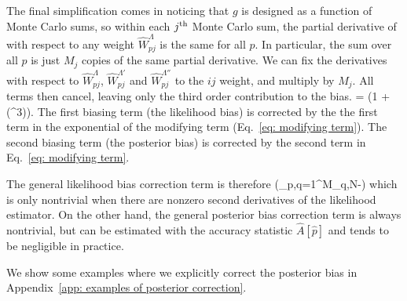 The final simplification comes in noticing that $g$ is designed as a function of Monte Carlo sums, so within each $j^{\rm th}$ Monte Carlo sum, the partial derivative of with respect to any weight $\hat{W}_{pj}^\Lambda$ is the same for all $p$. In particular, the sum over all $p$ is just $M_j$ copies of the same partial derivative. We can fix the derivatives with respect to $\hat{W}_{pj}^\Lambda$, $\hat{W}_{pj}^{\Lambda'}$ and $\hat{W}_{pj}^{\Lambda''}$ to the $ij$ weight, and multiply by $M_j$. All terms then cancel, leaving only the third order contribution to the bias.
\beq
{} = \left(1 + (\hat{\bm \delta}^3)\right).
\eeq
The first biasing term (the likelihood bias) is corrected by the the first term in the exponential of the modifying term (Eq.~\ref{eq: modifying term}). The second biasing term (the posterior bias) is corrected by the second term in Eq.~\ref{eq: modifying term}. 

The general likelihood bias correction term is therefore
\beq
\exp\left(\sum_{p,q=1}^{M_q,N}-\right)
\label{eq: general likelihood bias correction}
\eeq
which is only nontrivial when there are nonzero second derivatives of the likelihood estimator. On the other hand, the general posterior bias correction term is always nontrivial, but can be estimated with the accuracy statistic $\hat{A}[\hat{p}]$ and tends to be negligible in practice.

We show some examples where we explicitly correct the posterior bias in Appendix~\ref{app: examples of posterior correction}.

